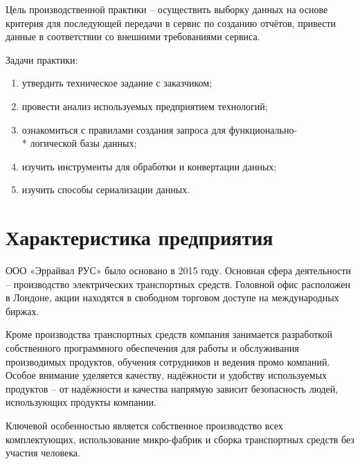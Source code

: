 



	

\normalsize

\setcounter{page}{2}

\tableofcontents
\normalsize

\pagebreak


Цель производственной практики -- осуществить выборку данных на основе критерия для последующей передачи в сервис по созданию отчётов, привести данные в соответствии со внешними требованиями сервиса\cite{microservice}. 

Задачи практики:
\begin{enumerate}
	\item утвердить техническое задание с заказчиком;
	\item провести анализ используемых предприятием технологий;
	\item ознакомиться с правилами создания запроса для функционально-\\* логической базы данных;
	\item изучить инструменты для обработки и конвертации данных;
	\item изучить способы сериализации\cite{serde} данных.
\end{enumerate}

\clearpage

\section{Характеристика предприятия}

ООО «Эррайвал РУС»\cite{arrival} было основано в 2015 году. Основная сфера деятельности – производство электрических транспортных средств. Головной офис расположен в Лондоне, акции находятся в свободном торговом доступе на международных биржах.

Кроме производства транспортных средств компания занимается разработкой собственного программного обеспечения для работы и обслуживания производимых продуктов, обучения сотрудников и ведения промо компаний. Особое внимание уделяется качеству, надёжности и удобству используемых продуктов -- от надёжности и качества напрямую зависит безопасность людей, использующих продукты компании.

Ключевой особенностью является собственное производство всех комплектующих, использование микро-фабрик и сборка транспортных средств без участия человека.

